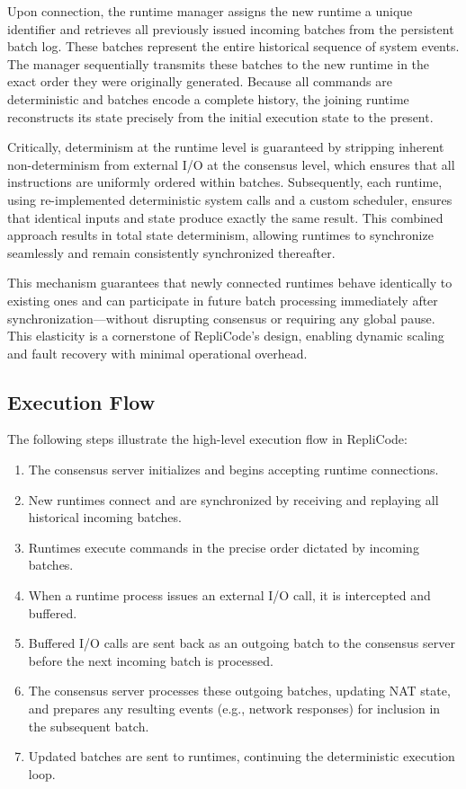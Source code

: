 \documentclass[10pt, 
]{IEEEtran}
\begin{document}
Upon connection, the runtime manager assigns the new runtime a unique identifier and retrieves all previously issued incoming batches from the persistent batch log. These batches represent the entire historical sequence of system events. The manager sequentially transmits these batches to the new runtime in the exact order they were originally generated. Because all commands are deterministic and batches encode a complete history, the joining runtime reconstructs its state precisely from the initial execution state to the present.

Critically, determinism at the runtime level is guaranteed by stripping inherent non-determinism from external I/O at the consensus level, which ensures that all instructions are uniformly ordered within batches. Subsequently, each runtime, using re-implemented deterministic system calls and a custom scheduler, ensures that identical inputs and state produce exactly the same result. This combined approach results in total state determinism, allowing runtimes to synchronize seamlessly and remain consistently synchronized thereafter.

This mechanism guarantees that newly connected runtimes behave identically to existing ones and can participate in future batch processing immediately after synchronization—without disrupting consensus or requiring any global pause. This elasticity is a cornerstone of RepliCode’s design, enabling dynamic scaling and fault recovery with minimal operational overhead.

\subsection{Execution Flow}

The following steps illustrate the high-level execution flow in RepliCode:

\begin{enumerate}
\item The consensus server initializes and begins accepting runtime connections.
\item New runtimes connect and are synchronized by receiving and replaying all historical incoming batches.
\item Runtimes execute commands in the precise order dictated by incoming batches.
\item When a runtime process issues an external I/O call, it is intercepted and buffered.
\item Buffered I/O calls are sent back as an outgoing batch to the consensus server before the next incoming batch is processed.
\item The consensus server processes these outgoing batches, updating NAT state, and prepares any resulting events (e.g., network responses) for inclusion in the subsequent batch.
\item Updated batches are sent to runtimes, continuing the deterministic execution loop.
\end{enumerate}
\end{document}
